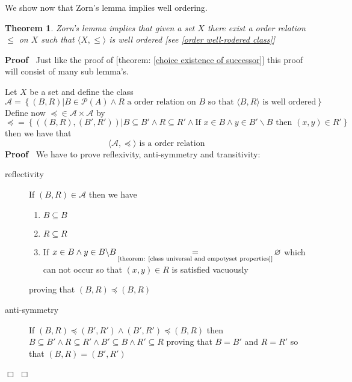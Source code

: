 \documentclass{book}
\newcommand{\equallim}{\mathop{=}\limits}
\newenvironment{proof}{\noindent\textbf{Proof\ }}{\hspace*{\fill}$\Box$\medskip}
\newtheorem{theorem}{Theorem}
\begin{document}
We show now that Zorn's lemma implies well ordering.

\begin{theorem}
  \label{choice Zorn implies welll ordering}Zorn's lemma implies that given a
  set $X$ there exist a order relation $\leqslant$ on $X$ such that $\langle
  X, \leqslant \rangle$ is well ordered [see \ref{order well-rodered class}] 
\end{theorem}

\begin{proof}
  Just like the proof of [theorem: \ref{choice existence of successor}] this
  proof will consist of many sub lemma's.
  
  Let $X$ be a set and define the class
  \[ \mathcal{A}= \left\{ (B, R) |B \in \mathcal{P} (A) \wedge R \text{ a
     order relation on $B$ so that } \langle B, R \rangle \text{ is well
     ordered} \right\} \]
  Define now $\preccurlyeq \in \mathcal{A} \times \mathcal{A}$ by
  \[ \preccurlyeq = \left\{ ((B, R), (B', R')) |B \subseteq B' \wedge R
     \subseteq R' \wedge \text{If } x \in B \wedge \text{} y \in B' \backslash
     B \text{ then } (x, y) \in R' \right\} \]
  then we have that
  \begin{equation}
    \label{eq 3.65.018} \langle \mathcal{A}, \preccurlyeq \rangle \text{ is a
    order relation}
  \end{equation}
  \begin{proof}
    We have to prove reflexivity, anti-symmetry and transitivity:
    \begin{description}
      \item[reflectivity] If $(B, R) \in \mathcal{A}$ then we have
      \begin{enumerate}
        \item $B \subseteq B$
        
        \item $R \subseteq R$
        
        \item If $x \in B \wedge y \in B\backslash B
        \equallim_{\text{[theorem: \ref{class universal and empotyset
        properties}]}} \varnothing$ which can not occur so that $(x, y) \in R$
        is satisfied vacuously
      \end{enumerate}
      proving that $(B, R) \preccurlyeq (B, R)$
      
      \item[anti-symmetry] If $(B, R) \preccurlyeq (B', R') \wedge (B', R')
      \preccurlyeq (B, R)$ then $B \subseteq B' \wedge R \subseteq R' \wedge
      B' \subseteq B \wedge R' \subseteq R$ proving that $B = B'$ and $R = R'$
      so that $(B, R) = (B', R')$
      

\end{description}
\end{proof}
\end{proof}
\end{document}
